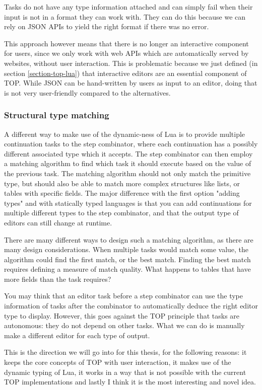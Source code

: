 Tasks do not have any type information attached and can simply fail when their input is not in a format they can work with. They can do this because we can rely on JSON APIs to yield the right format if there was no error.

This approach however means that there is no longer an interactive component for users, since we only work with web APIs which are automatically served by websites, without user interaction. This is problematic because we just defined (in section \ref{section-top-lua}) that interactive editors are an essential component of TOP. While JSON can be hand-written by users as input to an editor, doing that is not very user-friendly compared to the alternatives.

\subsubsection{Structural type matching}
A different way to make use of the dynamic-ness of Lua is to provide multiple continuation tasks to the step combinator, where each continuation has a possibly different associated type which it accepts. The step combinator can then employ a matching algorithm to find which task it should execute based on the value of the previous task.
The matching algorithm should not only match the primitive type, but should also be able to match more complex structures like lists, or tables with specific fields. The major difference with the first option "adding types" and with statically typed languages is that you can add continuations for multiple different types to the step combinator, and that the output type of editors can still change at runtime.

There are many different ways to design such a matching algorithm, as there are many design considerations. When multiple tasks would match some value, the algorithm could find the first match, or the best match. Finding the best match requires defining a measure of match quality. What happens to tables that have more fields than the task requires?

You may think that an editor task before a step combinator can use the type information of tasks after the combinator to automatically deduce the right editor type to display. However, this goes against the TOP principle that tasks are autonomous: they do not depend on other tasks. What we can do is manually make a different editor for each type of output.

This is the direction we will go into for this thesis, for the following reasons:
it keeps the core concepts of TOP with user interaction,
it makes use of the dynamic typing of Lua,
it works in a way that is not possible with the current TOP implementations
and lastly I think it is the most interesting and novel idea.

